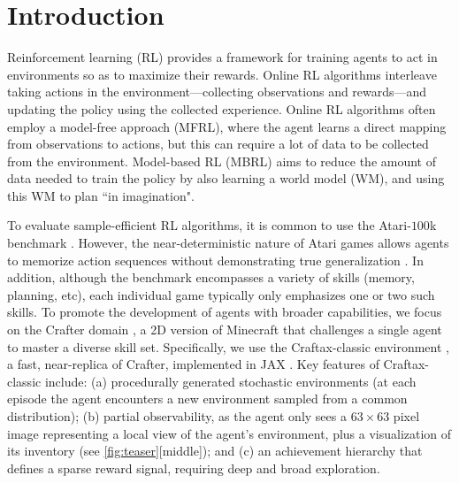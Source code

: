 \section{Introduction}
\label{sec:introduction}


Reinforcement learning (RL) \citep{sutton2018reinforcement} 
provides a framework for training agents to act in environments so as to maximize their rewards. Online RL algorithms interleave taking actions in the environment---collecting observations and rewards---and updating the policy using the collected experience. 
Online RL algorithms often employ a model-free approach (MFRL), where the agent learns a direct mapping from observations to actions,
but this can require a lot of data to be collected from the environment.
Model-based RL (MBRL) aims to reduce the amount of data needed to train the policy
 by also learning a world model (WM), and using this WM to plan ``in imagination".



To evaluate sample-efficient RL algorithms, it is common to use the
Atari-$100$k benchmark \citep{Kaiser2019}. However, the near-deterministic nature of Atari games allows agents to memorize action sequences without demonstrating true generalization \citep{Machado2018}.
In addition, although the benchmark encompasses a variety of  skills (memory, planning, etc), each individual game typically only emphasizes one or two such skills.
To promote the development of agents with broader capabilities, we focus on the Crafter domain \citep{hafner2021benchmarking},
a 2D version of Minecraft that challenges a single agent to master a diverse skill set.
Specifically, we use the  Craftax-classic environment \citep{matthews2024craftax},  a fast, near-replica of Crafter, implemented in JAX \citep{jax2018github}.
Key features of Craftax-classic include: %
(a) procedurally generated stochastic environments (at each episode the agent encounters a new environment sampled from a common distribution); 
(b) partial observability, as the agent only sees a $63 \times 63$ pixel image representing a local view of the agent's environment, plus a visualization of its inventory (see \cref{fig:teaser}[middle]);
and (c) an achievement hierarchy that defines a sparse reward signal, requiring deep and broad exploration.


